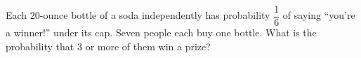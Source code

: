 Each $20$-ounce bottle of a soda independently has probability $\dfrac16$ of saying ``you're a winner!'' under its cap. Seven people each buy one bottle. What is the probability that $3$ or more of them win a prize?
